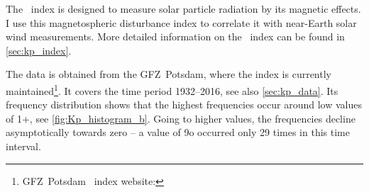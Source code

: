 The \Kp~index is designed to measure solar particle radiation by its magnetic effects. I use this magnetospheric disturbance index to correlate it with near-Earth solar wind measurements. More detailed information on the \Kp{}~index can be found in \autoref{sec:kp_index}.

The \Kp{} data is obtained from the GFZ~Potsdam, where the index is currently maintained\footnote{GFZ~Potsdam \Kp~index website: }. It covers the time period 1932--2016, see also \autoref{sec:kp_data}. Its frequency distribution shows that the highest frequencies occur around low \Kp{} values of 1+, see \autoref{fig:Kp_histogram_b}. Going to higher \Kp{} values, the frequencies decline asymptotically towards zero -- a \Kp{} value of 9o occurred only 29 times in this time interval.\\
\begin{figure}[htb]
	\begin{floatrow}
	\end{floatrow}
\end{figure}

